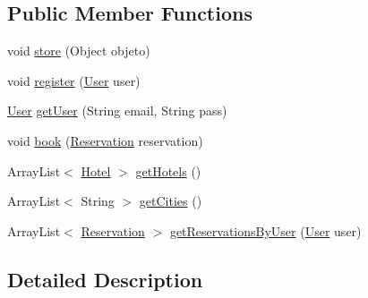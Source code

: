 \subsection*{Public Member Functions}
\begin{DoxyCompactItemize}
\item 
void \mbox{\hyperlink{interfacebspq18__e4_1_1_gestion_hotelera_1_1server_1_1dao_1_1_i_hotel_d_a_o_a4e3c6763bb643d660babac78c6e29559}{store}} (Object objeto)
\item 
void \mbox{\hyperlink{interfacebspq18__e4_1_1_gestion_hotelera_1_1server_1_1dao_1_1_i_hotel_d_a_o_a9756103fe06e2238d0a3454b09c92145}{register}} (\mbox{\hyperlink{classbspq18__e4_1_1_gestion_hotelera_1_1server_1_1data_1_1_user}{User}} user)
\item 
\mbox{\hyperlink{classbspq18__e4_1_1_gestion_hotelera_1_1server_1_1data_1_1_user}{User}} \mbox{\hyperlink{interfacebspq18__e4_1_1_gestion_hotelera_1_1server_1_1dao_1_1_i_hotel_d_a_o_a1de8539206849f50aa8893686acd009d}{get\+User}} (String email, String pass)
\item 
void \mbox{\hyperlink{interfacebspq18__e4_1_1_gestion_hotelera_1_1server_1_1dao_1_1_i_hotel_d_a_o_a02829c71aba68950eaee5c993d5065d6}{book}} (\mbox{\hyperlink{classbspq18__e4_1_1_gestion_hotelera_1_1server_1_1data_1_1_reservation}{Reservation}} reservation)
\item 
Array\+List$<$ \mbox{\hyperlink{classbspq18__e4_1_1_gestion_hotelera_1_1server_1_1data_1_1_hotel}{Hotel}} $>$ \mbox{\hyperlink{interfacebspq18__e4_1_1_gestion_hotelera_1_1server_1_1dao_1_1_i_hotel_d_a_o_a025324d204edaa7c021c6eed22804882}{get\+Hotels}} ()
\item 
Array\+List$<$ String $>$ \mbox{\hyperlink{interfacebspq18__e4_1_1_gestion_hotelera_1_1server_1_1dao_1_1_i_hotel_d_a_o_a1e78f89bca341643baaac80e27c7ba20}{get\+Cities}} ()
\item 
Array\+List$<$ \mbox{\hyperlink{classbspq18__e4_1_1_gestion_hotelera_1_1server_1_1data_1_1_reservation}{Reservation}} $>$ \mbox{\hyperlink{interfacebspq18__e4_1_1_gestion_hotelera_1_1server_1_1dao_1_1_i_hotel_d_a_o_afa1838e14526101d626d241da08c3b13}{get\+Reservations\+By\+User}} (\mbox{\hyperlink{classbspq18__e4_1_1_gestion_hotelera_1_1server_1_1data_1_1_user}{User}} user)
\end{DoxyCompactItemize}


\subsection{Detailed Description}


